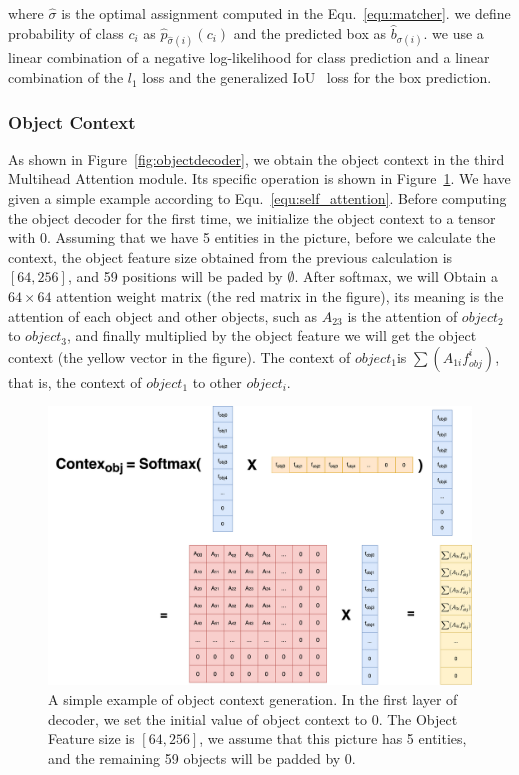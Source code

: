 where $ \hat{\sigma} $ is the optimal assignment computed in the Equ.~\ref{equ:matcher}. we define probability of class $ c_i $ as $ \hat{p}_{\hat{\sigma}(i)}(c_i)$ and the predicted box as $ \hat{b}_{\sigma(i)} $. we use a linear combination of a negative log-likelihood for class prediction and a linear combination of the $  l_1  $ loss and the generalized IoU~\cite{rezatofighi2019generalized} loss for the box prediction.


\subsubsection{Object Context}

As shown in Figure~\ref{fig:objectdecoder}, we obtain the object context in the third Multihead Attention module. Its specific operation is shown in Figure~\ref{fig:objcontext}. We have given a simple example according to Equ.~\ref{equ:self_attention}. Before computing the object decoder for the first time, we initialize the object context to a tensor with 0. Assuming that we have 5 entities in the picture, before we calculate the context, the object feature size obtained from the previous calculation is $ [64, 256] $, and 59 positions will be paded by $\emptyset$. After softmax, we will Obtain a $ 64 \times 64  $ attention weight matrix (the red matrix in the figure), its meaning is the attention of each object and other objects, such as $ A_{23}$ is the attention of $ object_2 $ to $ object_3 $, and finally multiplied by the object feature we will get the object context (the yellow vector in the figure). The context of $ object_1  $is $ \sum(A_{1i}f_{obj}^i) $, that is, the context of $ object_1 $ to other $ object_i $.

\begin{figure}[tbph!]
	\centering
	\includegraphics[width=1\linewidth]{figures/obj_context}
	\caption[A simple example of the  Object Context generation.]{A simple example of object context generation. In the first layer of decoder, we set the initial value of object context to 0. The Object Feature size is $ [64, 256] $, we assume that this picture has 5 entities, and the remaining 59 objects will be padded by 0.}
	\label{fig:objcontext}
\end{figure}


